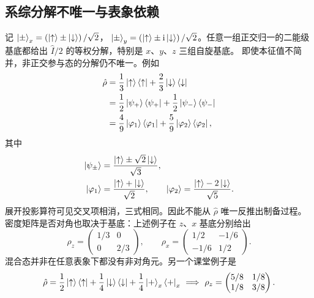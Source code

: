 \subsection{系综分解不唯一与表象依赖}
记 $\Ket{\pm}_x=\left(\Ket{\uparrow}\pm\Ket{\downarrow}\right)/\sqrt2$，
$\Ket{\pm}_y=\left(\Ket{\uparrow}\pm\mathrm{i}\Ket{\downarrow}\right)/\sqrt2$。任意一组正交归一的二能级基底都给出 $\hat I/2$ 的等权分解，特别是 $x$、$y$、$z$ 三组自旋基底。
即使本征值不简并，非正交参与态的分解仍不唯一。例如
\begin{align}
\hat\rho&=\frac13\Ket{\uparrow}\Bra{\uparrow}+\frac23\Ket{\downarrow}\Bra{\downarrow}\notag\\
&=\frac12\Ket{\psi_+}\Bra{\psi_+}+\frac12\Ket{\psi_-}\Bra{\psi_-}\notag\\
&=\frac49\Ket{\varphi_1}\Bra{\varphi_1}+\frac59\Ket{\varphi_2}\Bra{\varphi_2},
\end{align}
其中
\begin{align}
\Ket{\psi_\pm}&=\frac{\Ket{\uparrow}\pm\sqrt2\Ket{\downarrow}}{\sqrt3},\\
\Ket{\varphi_1}&=\frac{\Ket{\uparrow}+\Ket{\downarrow}}{\sqrt2},\qquad
\Ket{\varphi_2}=\frac{\Ket{\uparrow}-2\Ket{\downarrow}}{\sqrt5}.
\end{align}
展开投影算符可见交叉项相消，三式相同。因此不能从 $\hat\rho$ 唯一反推出制备过程。
密度矩阵是否对角也取决于基底：上述例子在 $z$、$x$ 基底分别给出
\begin{equation}
\rho_z=\left(\begin{matrix}1/3&0\\0&2/3\end{matrix}\right),\qquad
\rho_x=\left(\begin{matrix}1/2&-1/6\\-1/6&1/2\end{matrix}\right).
\end{equation}
混合态并非在任意表象下都没有非对角元。另一个课堂例子是
\begin{equation}
\hat\rho=\frac12\Ket{\uparrow}\Bra{\uparrow}+\frac14\Ket{\downarrow}\Bra{\downarrow}+\frac14\Ket{+}_x\Bra{+}_x
\ \Longrightarrow\ 
\rho_z=\left(\begin{matrix}5/8&1/8\\1/8&3/8\end{matrix}\right).
\end{equation}
